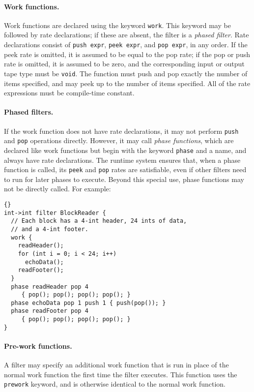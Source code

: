 \documentclass[11pt]{article}
\begin{document}
\paragraph{Work functions.}  Work functions are declared using the
keyword \lstinline|work|.  This keyword may be followed by rate
declarations; if these are absent, the filter is a \emph{phased
  filter}.  Rate declarations consist of \lstinline|push expr|,
\lstinline|peek expr|, and \lstinline|pop expr|, in any order.  If the
peek rate is omitted, it is assumed to be equal to the pop rate; if
the pop or push rate is omitted, it is assumed to be zero, and the
corresponding input or output tape type must be \lstinline|void|.  The
function must push and pop exactly the number of items specified, and
may peek up to the number of items specified.  All of the rate
expressions must be compile-time constant.

\paragraph{Phased filters.}  If the work function does not have rate
declarations, it may not perform \lstinline|push| and \lstinline|pop|
operations directly.  However, it may call \emph{phase functions},
which are declared like work functions but begin with the keyword
\lstinline|phase| and a name, and always have rate declarations.  The
runtime system ensures that, when a phase function is called, its
\lstinline|peek| and \lstinline|pop| rates are satisfiable, even if
other filters need to run for later phases to execute.  Beyond this
special use, phase functions may not be directly called.  For example:

\begin{lstlisting}{}
int->int filter BlockReader {
  // Each block has a 4-int header, 24 ints of data,
  // and a 4-int footer.
  work {
    readHeader();
    for (int i = 0; i < 24; i++)
      echoData();
    readFooter();
  }
  phase readHeader pop 4
     { pop(); pop(); pop(); pop(); }
  phase echoData pop 1 push 1 { push(pop()); }
  phase readFooter pop 4
     { pop(); pop(); pop(); pop(); }
}
\end{lstlisting}

\paragraph{Pre-work functions.}  A filter may specify an additional
work function that is run in place of the normal work function the
first time the filter executes.  This function uses the
\lstinline|prework| keyword, and is otherwise identical to the normal
work function.
\end{document}
